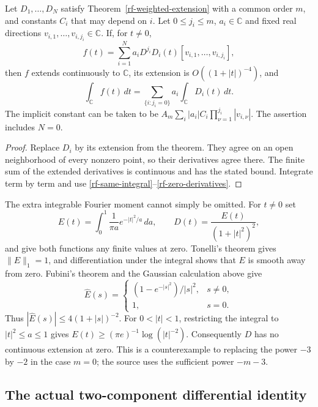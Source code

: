 \begin{corollary}\label{rf-finite-combination}
Let $D_1,\ldots,D_N$ satisfy
Theorem~\ref{rf-weighted-extension} with a common order $m$,
and constants $C_i$ that may depend on $i$.  Let $0\leq j_i\leq m$,
$a_i\in\mathbb C$ and fixed real directions
$v_{i,1},\ldots,v_{i,j_i}\in\mathbb C$.
If, for $t\ne0$,
\[
 f(t)=\sum_{i=1}^N a_i
      D^{j_i}D_i(t)[v_{i,1},\ldots,v_{i,j_i}],
\]
then $f$ extends continuously to $\mathbb C$, its extension
is $O((1+|t|)^{-4})$, and
\[
        \int_{\mathbb C}f(t)\,dt
           =\sum_{\{i:j_i=0\}}a_i\int_{\mathbb C}D_i(t)\,dt.
\]
The implicit constant can be taken to be
$A_m\sum_i |a_i|C_i\prod_{\nu=1}^{j_i}|v_{i,\nu}|$.
The assertion includes $N=0$.
\end{corollary}

\begin{proof}
Replace $D_i$ by its extension from the theorem.
They agree on an open neighborhood of every nonzero point,
so their derivatives agree there.  The finite sum of the
extended derivatives is continuous and has the stated
bound.  Integrate term by term and use
\eqref{rf-same-integral}--\eqref{rf-zero-derivatives}.
\end{proof}

\begin{example}\label{rf-critical-power}
The extra integrable Fourier moment cannot simply be omitted.
For $t\ne0$ set
\[
 E(t)=\int_0^1\frac1{\pi a}e^{-|t|^2/a}\,da,\qquad
 D(t)=\frac{E(t)}{(1+|t|^2)^2},
\]
and give both functions any finite values at zero.
Tonelli's theorem gives $\|E\|_1=1$, and differentiation
under the integral shows that $E$ is smooth away from zero.
Fubini's theorem and the Gaussian calculation above give
\[
 \widehat E(s)=
 \begin{cases}
 (1-e^{-|s|^2})/|s|^2,&s\ne0,\\
 1,&s=0.
 \end{cases}
\]
Thus $|\widehat E(s)|\leq4(1+|s|)^{-2}$.
For $0<|t|<1$, restricting the integral to
$|t|^2\leq a\leq1$ gives
$E(t)\geq(\pi e)^{-1}\log(|t|^{-2})$.
Consequently $D$ has no continuous extension at zero.
This is a counterexample to replacing the power $-3$
by $-2$ in the case $m=0$; the source uses the sufficient
power $-m-3$.
\end{example}

\subsection{The actual two-component differential identity}

